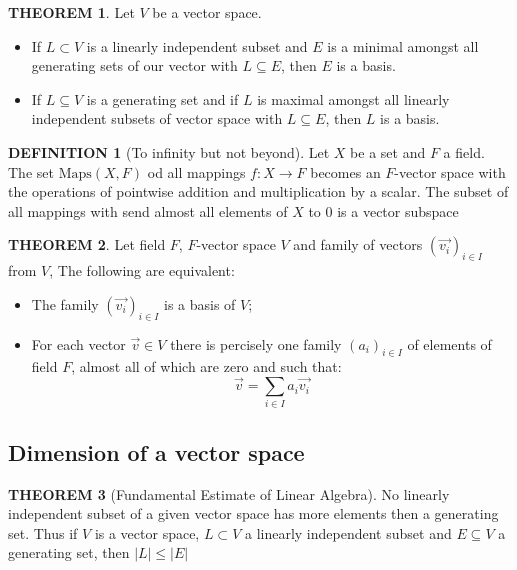 \documentclass[12pt]{article}
\theoremstyle{definition}
\newtheorem{definition}{DEFINITION}[subsection]
\newtheorem{theorem}{THEOREM}[subsection]
\newcommand{\Maps}{\text{Maps}}
\begin{document}
\begin{theorem}
    Let $V$ be a vector space.
    \begin{itemize}
        \item If $L \subset V$ is a linearly independent subset and $E$ is a minimal amongst all generating sets of our vector with $L \subseteq E$, then $E$ is a basis.
        \item If $L \subseteq V$ is a generating set and if $L$ is maximal amongst all linearly independent subsets of vector space with $L \subseteq E$, then $L$ is a basis.
    \end{itemize}
\end{theorem}

\begin{definition}[To infinity but not beyond]
    Let $X$ be a set and $F$ a field. The set $\Maps(X,F)$ od all mappings $f: X \rightarrow F$ becomes an $F$-vector space with the operations of pointwise addition and multiplication by a scalar. The subset of all mappings with send almost all elements of $X$ to 0 is a vector subspace
\end{definition}

\begin{theorem}
    Let field $F$, $F$-vector space $V$ and family of vectors $(\overrightarrow{v_i})_{i\in I}$ from $V$, The following are equivalent:
    \begin{itemize}
        \item The family $(\overrightarrow{v_i})_{i\in I}$ is a basis of $V$;
        \item For each vector $\overrightarrow{v} \in V$ there is percisely one family $(a_i)_{i\in I}$ of elements of field $F$, almost all of which are zero and such that: $$\overrightarrow{v} = \sum_{i\in I} {a_i\overrightarrow{v_i}}$$
    \end{itemize}
\end{theorem}

\subsection{Dimension of a vector space}
\begin{theorem}[Fundamental Estimate of Linear Algebra]
    No linearly independent subset of a given vector space has more elements then a generating set. Thus if $V$ is a vector space, $L \subset V$ a linearly independent subset and $E \subseteq V$ a generating set, then $|L| \leq |E|$
\end{theorem}
\end{document}
